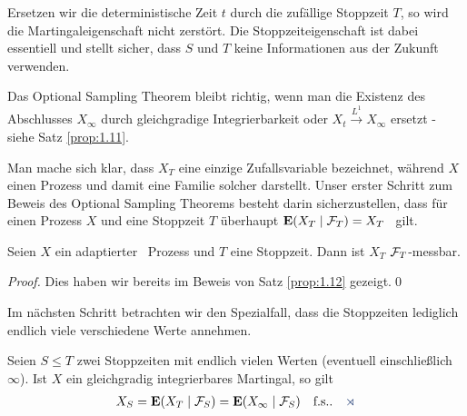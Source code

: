 Ersetzen wir die deterministische Zeit $t$ durch die zufällige Stoppzeit $T$, so
wird die Martingaleigenschaft nicht zerstört. Die Stoppzeiteigenschaft ist
dabei essentiell und stellt sicher, dass $S$ und $T$ keine Informationen
aus der Zukunft verwenden.

\begin{rem*}
Das Optional Sampling Theorem bleibt richtig, wenn man die Existenz des
Abschlusses $X_\infty$ durch gleichgradige Integrierbarkeit oder
$X_t\xrightarrow{L^1}X_\infty$ ersetzt - siehe
Satz \ref{prop:1.11}.\map
\end{rem*}

Man mache sich klar, dass $X_T$ eine einzige Zufallsvariable bezeichnet, während
$X$ einen Prozess und damit eine Familie solcher darstellt. Unser erster Schritt
zum Beweis des Optional Sampling Theorems besteht darin sicherzustellen, dass
für einen Prozess $X$ und eine Stoppzeit $T$ überhaupt $\mathbf{E}(X_T\mid \mathcal{F}_T) = X_T$
\fs\ gilt.


\begin{prop}
\label{prop:1.14}
Seien $X$ ein adaptierter \cadlag\ Prozess und $T$ eine Stoppzeit. Dann ist
$X_T$ $\mathcal{F}_T$-messbar.\fish
\end{prop}

\begin{proof}
Dies haben wir bereits im Beweis von Satz \ref{prop:1.12} gezeigt.\qed
\end{proof}

Im nächsten Schritt betrachten wir den Spezialfall, dass die Stoppzeiten
lediglich endlich viele verschiedene Werte annehmen.


\begin{prop}
\label{prop:1.15}
Seien $S\le T$ zwei Stoppzeiten mit endlich vielen Werten (eventuell 
einschließlich $\infty$). Ist $X$ ein gleichgradig integrierbares Martingal, so
gilt
\begin{align*}
X_S=\E(X_T\mid\FF_S) = \E(X_\infty \mid\FF_S) \quad \fs.\fish
\end{align*}
\end{prop}

